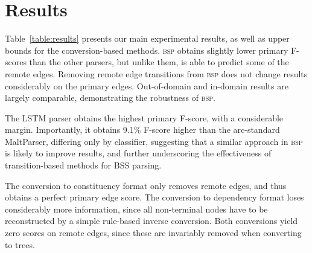 \documentclass[11pt,letterpaper]{article}
\newcommand{\tabref}[1]{Table~\ref{#1}}
\begin{document}
\section{Results}\label{sec:results}

\tabref{table:results} presents our main experimental results, as well as
upper bounds for the conversion-based methods.
\textsc{bsp} obtains slightly lower primary F-scores than the other parsers,
but unlike them, is able to predict some of the remote edges. 
Removing remote edge transitions from \textsc{bsp} does not
change results considerably on the primary edges.
Out-of-domain and in-domain results are largely comparable,
demonstrating the robustness of \textsc{bsp}.

The LSTM parser obtains the highest primary F-score,
with a considerable margin. Importantly, it obtains 9.1\%
F-score higher than the arc-standard MaltParser,
differing only by classifier,
suggesting that a similar approach in
\textsc{bsp} is likely to improve results,
and further underscoring the effectiveness of transition-based 
methods for BSS parsing. 

The conversion to constituency format only removes remote edges,
and thus obtains a perfect primary edge score.
The conversion to dependency format loses considerably more information, since
all non-terminal nodes have to be reconstructed by a
simple rule-based inverse conversion. Both conversions yield zero scores on remote edges,
since these are invariably removed when converting to trees.
\end{document}
